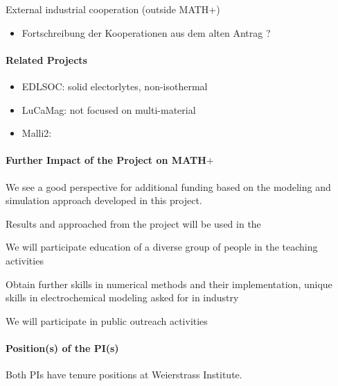 \documentclass[a4paper,10pt]{article}
\begin{document}
External industrial cooperation (outside MATH+)
\begin{itemize}
\item Fortschreibung der Kooperationen aus dem alten Antrag ?
\end{itemize}

\paragraph{Related Projects}
\begin{itemize}
\item EDLSOC: solid electorlytes, non-isothermal
\item LuCaMag: not focused on multi-material
\item Malli2: 
\end{itemize}

\paragraph{Further Impact of the Project on MATH$+$}
We see a good perspective for additional funding based on the modeling and simulation approach
developed in this project.

Results and approached from the project will be used in the 

We will participate education of a diverse group of people in the teaching activities

Obtain further skills in numerical methods and their implementation, unique skills in electrochemical
modeling asked for in  industry

We will participate in public outreach activities

\paragraph{Position(s) of the PI(s)}
Both PIs have tenure positions at Weierstrass Institute.
\end{document}
